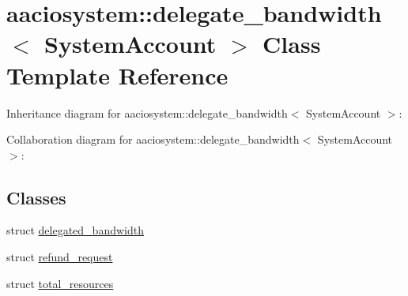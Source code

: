 \hypertarget{classaaciosystem_1_1delegate__bandwidth}{}\section{aaciosystem\+:\+:delegate\+\_\+bandwidth$<$ System\+Account $>$ Class Template Reference}
\label{classaaciosystem_1_1delegate__bandwidth}


Inheritance diagram for aaciosystem\+:\+:delegate\+\_\+bandwidth$<$ System\+Account $>$\+:


Collaboration diagram for aaciosystem\+:\+:delegate\+\_\+bandwidth$<$ System\+Account $>$\+:
\subsection*{Classes}
\begin{DoxyCompactItemize}
\item 
struct \mbox{\hyperlink{structaaciosystem_1_1delegate__bandwidth_1_1delegated__bandwidth}{delegated\+\_\+bandwidth}}
\item 
struct \mbox{\hyperlink{structaaciosystem_1_1delegate__bandwidth_1_1refund__request}{refund\+\_\+request}}
\item 
struct \mbox{\hyperlink{structaaciosystem_1_1delegate__bandwidth_1_1total__resources}{total\+\_\+resources}}
\end{DoxyCompactItemize}
